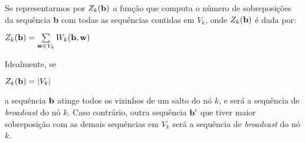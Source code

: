 






Se representarmos por $Z_{k}({\bf b})$ a função que computa o número de sobreposições da sequência {\bf b} com todas as sequências contidas em $V_{k}$, onde $Z_{k}({\bf b})$ é dada por: 


\vspace{0.3cm}

$Z_{k}({\bf b}) = \sum \limits_{{\bf w} \in V_{k}} W_{k}({\bf b},{\bf w})$

\vspace{0.3cm}

Idealmente, se
\vspace{0.3cm}

$Z_{k}({\bf b}) = |V_{k}|$

\vspace{0.3cm}

\hspace{-0.7cm} a sequência ${\bf b}$ atinge todos os vizinhos de um salto do nó $k$, e será a sequência de {\it broadcast} do nó $k$. Caso contrário, outra sequência ${\bf b'}$ que tiver maior sobreposição com as demais sequências em $V_{k}$ será a sequência de {\it broadcast} do nó $k$. 



